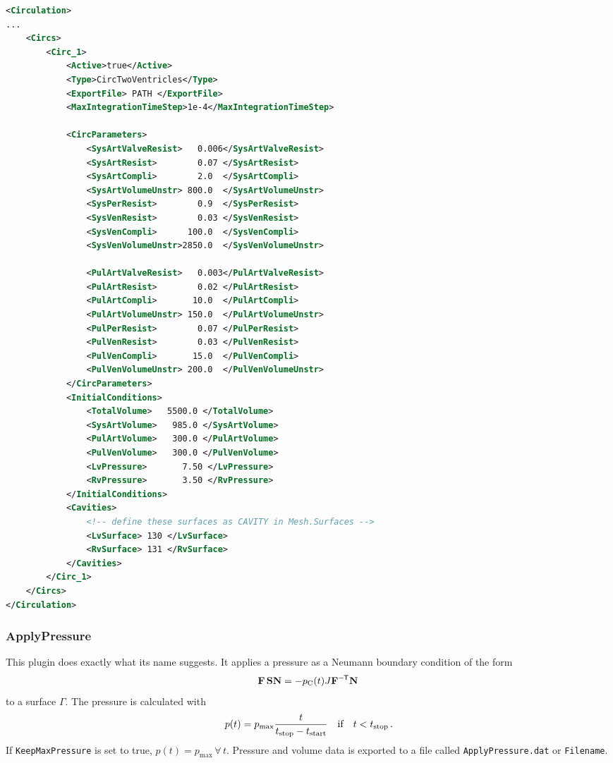 \begin{lstlisting}[language=XML,caption=.xml settings for the 2-chamber circulation model]
<Circulation>
...
    <Circs>
        <Circ_1>
            <Active>true</Active>
            <Type>CircTwoVentricles</Type>
            <ExportFile> PATH </ExportFile>
            <MaxIntegrationTimeStep>1e-4</MaxIntegrationTimeStep>
            
            <CircParameters>
                <SysArtValveResist>   0.006</SysArtValveResist>
                <SysArtResist>        0.07 </SysArtResist>
                <SysArtCompli>        2.0  </SysArtCompli>
                <SysArtVolumeUnstr> 800.0  </SysArtVolumeUnstr>
                <SysPerResist>        0.9  </SysPerResist>
                <SysVenResist>        0.03 </SysVenResist>
                <SysVenCompli>      100.0  </SysVenCompli>
                <SysVenVolumeUnstr>2850.0  </SysVenVolumeUnstr>

                <PulArtValveResist>   0.003</PulArtValveResist>
                <PulArtResist>        0.02 </PulArtResist>
                <PulArtCompli>       10.0  </PulArtCompli>
                <PulArtVolumeUnstr> 150.0  </PulArtVolumeUnstr>
                <PulPerResist>        0.07 </PulPerResist>
                <PulVenResist>        0.03 </PulVenResist>
                <PulVenCompli>       15.0  </PulVenCompli>
                <PulVenVolumeUnstr> 200.0  </PulVenVolumeUnstr>
            </CircParameters>
            <InitialConditions>
                <TotalVolume>   5500.0 </TotalVolume>
                <SysArtVolume>   985.0 </SysArtVolume>
                <PulArtVolume>   300.0 </PulArtVolume>
                <PulVenVolume>   300.0 </PulVenVolume>
                <LvPressure>       7.50 </LvPressure>
                <RvPressure>       3.50 </RvPressure>
            </InitialConditions>
            <Cavities>
                <!-- define these surfaces as CAVITY in Mesh.Surfaces -->
                <LvSurface> 130 </LvSurface>
                <RvSurface> 131 </RvSurface>
            </Cavities>
        </Circ_1>
    </Circs>
</Circulation>
\end{lstlisting}

\subsubsection{ApplyPressure}
\label{plugin:ApplyPressure}

This plugin does exactly what its name suggests.
It applies a pressure as a Neumann boundary condition of the form
\begin{equation}
    \F\,\S \vec N = -\p{C}(t) J \vec F^{-\tran} \vec N \,
\end{equation}
to a surface $\Gamma$.
The pressure is calculated with
\begin{equation}
    p(t) = p_\mathrm{max} \frac{t}{t_\mathrm{stop} - t_\mathrm{start}} \qif t < t_\mathrm{stop} \,.
\end{equation}
If \verb|KeepMaxPressure| is set to true, $p(t) = p_\mathrm{max} \, \forall \, t$.
Pressure and volume data is exported to a file called \verb|ApplyPressure.dat| or \verb|Filename|.

